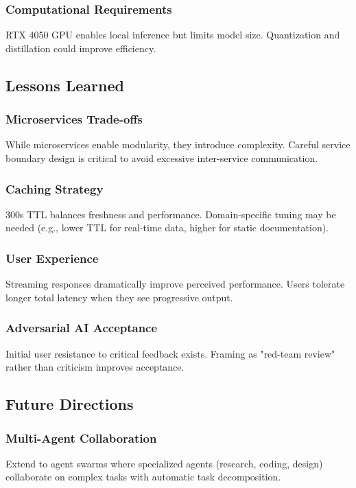 \documentclass[conference]{IEEEtran}
\begin{document}
\subsubsection{Computational Requirements}
RTX 4050 GPU enables local inference but limits model size. Quantization and distillation could improve efficiency.

\subsection{Lessons Learned}

\subsubsection{Microservices Trade-offs}
While microservices enable modularity, they introduce complexity. Careful service boundary design is critical to avoid excessive inter-service communication.

\subsubsection{Caching Strategy}
300s TTL balances freshness and performance. Domain-specific tuning may be needed (e.g., lower TTL for real-time data, higher for static documentation).

\subsubsection{User Experience}
Streaming responses dramatically improve perceived performance. Users tolerate longer total latency when they see progressive output.

\subsubsection{Adversarial AI Acceptance}
Initial user resistance to critical feedback exists. Framing as "red-team review" rather than criticism improves acceptance.

\subsection{Future Directions}

\subsubsection{Multi-Agent Collaboration}
Extend to agent swarms where specialized agents (research, coding, design) collaborate on complex tasks with automatic task decomposition.
\end{document}

